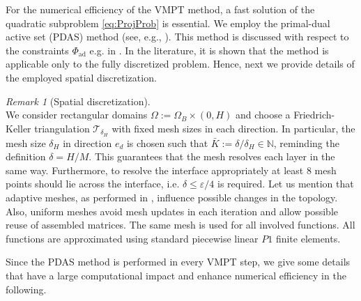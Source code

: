 \documentclass[a4paper,11pt]{article}
\theoremstyle{remark}
\newtheorem{remark}{Remark}%
\newcommand{\deltax}{\delta_H}
\newcommand{\Pad}{\Phi_{\text{ad}}}
\newcommand{\N}{\mathbb{N}}
\begin{document}
For the numerical efficiency of the VMPT method, a fast solution of the quadratic subproblem \eqref{eq:ProjProb} is essential.
We employ the primal-dual active set (PDAS) method (see, e.g., \cite{HIK02}).
This method is discussed with respect to the constraints $\Pad$ e.g. in \cite{BGSS13b,BSS12}.
In the literature, it is shown that the method is applicable only to the fully discretized problem.
Hence, next we provide details of the employed spatial discretization.
\begin{remark}[Spatial discretization]\label{Discretization}{\rm  \hfill \\
We consider rectangular domains $\Omega:= \Omega_B \times (0,H)$ and choose a Friedrich-Keller triangulation $\mathcal{T}_{\deltax}$ with fixed mesh sizes in each direction. 
In particular, the mesh size $\deltax$ in direction $e_d$ is chosen such that $\bar K :=\delta / \deltax \in \N$, reminding the definition $\delta=H/M$.
%
This guarantees that the mesh resolves each layer in the same way.
Furthermore, to resolve the interface appropriately at least 8 mesh points should lie across the interface, i.e. $\delta \leq \varepsilon/4$ is required.
%
Let us mention that adaptive meshes, as performed in \cite{AdaptiveMeshStructOptim}, influence possible changes in the topology.
Also, uniform meshes avoid mesh updates in each iteration and allow possible reuse of assembled matrices.
The same mesh is used for all involved functions.
All functions are approximated using standard piecewise linear $P1$ finite elements.}
\end{remark}
Since the PDAS method is performed in every VMPT step, we give some details that have a large computational impact and enhance numerical efficiency in the following. 
% 
\end{document}
